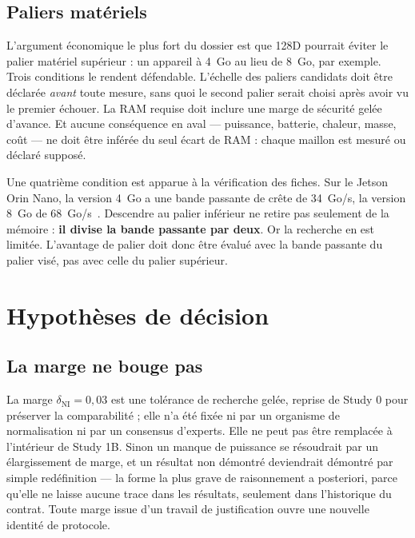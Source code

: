 \documentclass[11pt,a4paper]{article}
\begin{document}
\subsection{Paliers matériels}

L'argument économique le plus fort du dossier est que 128D pourrait éviter le palier
matériel supérieur : un appareil à 4~Go au lieu de 8~Go, par exemple. Trois conditions
le rendent défendable. L'échelle des paliers candidats doit être déclarée \emph{avant}
toute mesure, sans quoi le second palier serait choisi après avoir vu le premier
échouer. La RAM requise doit inclure une marge de sécurité gelée d'avance. Et aucune
conséquence en aval — puissance, batterie, chaleur, masse, coût — ne doit être
inférée du seul écart de RAM : chaque maillon est mesuré ou déclaré supposé.

Une quatrième condition est apparue à la vérification des fiches. Sur le Jetson Orin
Nano, la version 4~Go a une bande passante de crête de 34~Go/s, la version 8~Go de
68~Go/s~\cite{nvds}. Descendre au palier inférieur ne retire pas seulement de la
mémoire : \textbf{il divise la bande passante par deux}. Or la recherche en est
limitée. L'avantage de palier doit donc être évalué avec la bande passante du palier
visé, pas avec celle du palier supérieur.

\section{Hypothèses de décision}\label{sec:decision}

\subsection{La marge ne bouge pas}

La marge $\delta_{\mathrm{NI}} = 0{,}03$ est une tolérance de recherche gelée, reprise
de Study 0 pour préserver la comparabilité ; elle n'a été fixée ni par un organisme de
normalisation ni par un consensus d'experts. Elle ne peut pas être remplacée à
l'intérieur de Study 1B. Sinon un manque de puissance se résoudrait par un
élargissement de marge, et un résultat \og non démontré \fg{} deviendrait \og démontré \fg{}
par simple redéfinition — la forme la plus grave de raisonnement a posteriori, parce
qu'elle ne laisse aucune trace dans les résultats, seulement dans l'historique du
contrat. Toute marge issue d'un travail de justification ouvre une nouvelle identité
de protocole.
\end{document}
